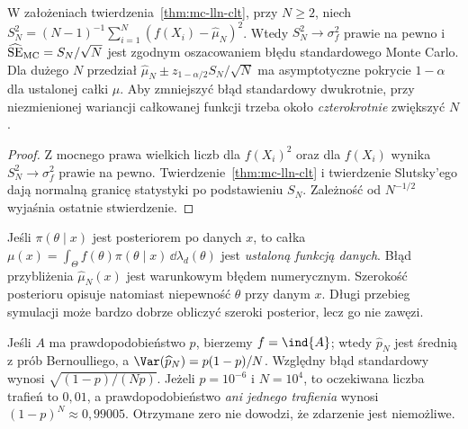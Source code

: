 \begin{wniosek}
\label{cor:mc-se}
W założeniach twierdzenia~\ref{thm:mc-lln-clt}, przy $N\ge2$, niech
$S_N^2=(N-1)^{-1}\sum_{i=1}^N(f(X_i)-\widehat\mu_N)^2$.
Wtedy $S_N^2\to\sigma_f^2$ prawie na pewno i
$\widehat{\mathrm{SE}}_{\rm MC}=S_N/\sqrt N$ jest zgodnym
oszacowaniem błędu standardowego Monte Carlo. Dla dużego $N$
przedział $\widehat\mu_N\pm z_{1-\alpha/2}S_N/\sqrt N$
ma asymptotyczne pokrycie $1-\alpha$ dla ustalonej całki $\mu$.
Aby zmniejszyć błąd standardowy dwukrotnie, przy niezmienionej
wariancji całkowanej funkcji trzeba około \emph{czterokrotnie}
zwiększyć $N$.
\end{wniosek}
\begin{proof}
Z mocnego prawa wielkich liczb dla $f(X_i)^2$ oraz dla $f(X_i)$
wynika $S_N^2\to\sigma_f^2$ prawie na pewno.
Twierdzenie~\ref{thm:mc-lln-clt} i twierdzenie Slutsky'ego
dają normalną granicę statystyki po podstawieniu $S_N$.
Zależność od $N^{-1/2}$ wyjaśnia ostatnie stwierdzenie.
\end{proof}

\begin{uwaga}
Jeśli $\pi(\theta\mid x)$ jest posteriorem po danych $x$, to
całka $\mu(x)=\int_\Theta f(\theta)\pi(\theta\mid x)\,
\dd\lambda_d(\theta)$ jest \emph{ustaloną funkcją danych}.
Błąd przybliżenia $\widehat\mu_N(x)$ jest warunkowym błędem
numerycznym. Szerokość posterioru opisuje natomiast niepewność
$\theta$ przy danym $x$. Długi przebieg symulacji może bardzo dobrze
obliczyć szeroki posterior, lecz go nie zawęzi.
\end{uwaga}

\begin{przyklad}
\label{ex:mc-rare}
Jeśli $A$ ma prawdopodobieństwo $p$, bierzemy
$f=\ind{A}$; wtedy $\widehat p_N$ jest średnią z prób Bernoulliego,
a $\Var(\widehat p_N)=p(1-p)/N$. Względny błąd standardowy wynosi
$\sqrt{(1-p)/(Np)}$. Jeżeli $p=10^{-6}$ i $N=10^4$,
to oczekiwana liczba trafień to $0{,}01$, a prawdopodobieństwo
\emph{ani jednego trafienia} wynosi $(1-p)^N\approx0{,}99005$.
Otrzymane zero nie dowodzi, że zdarzenie jest niemożliwe.
\end{przyklad}

